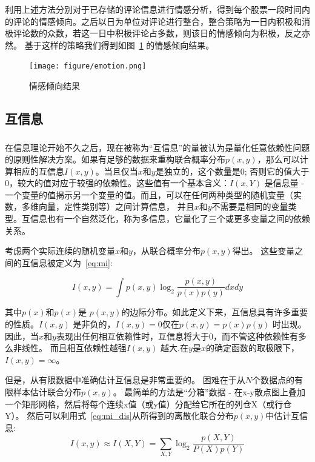 \documentclass[cs4size,a4paper]{ctexart}
\numberwithin{equation}{section}
\numberwithin{table}{section}
\numberwithin{figure}{section}
\newcommand{\upcite}[1]{\textsuperscript{\textsuperscript{\cite{#1}}}}%
\begin{document}
利用上述方法分别对于已存储的评论信息进行情感分析，得到每个股票一段时间内的评论的情感倾向。之后以日为单位对评论进行整合，整合策略为一日内积极和消极评论数的众数，若这一日中积极评论占多数，则该日的情感倾向为积极，反之亦然。
基于这样的策略我们得到如图~\ref{fig:emotion} 的情感倾向结果。
\begin{figure}
  \centering
  \captionsetup{justification=centering,margin=2cm}
  \texttt{[image: figure/emotion.png]}
\caption{情感倾向结果}
\label{fig:emotion}
\end{figure}

\subsection{互信息}

在信息理论开始不久之后\upcite{hockett1953mathematical}，现在被称为“互信息”的量被认为是量化任意依赖性问题的原则性解决方案。如果有足够的数据来重构联合概率分布$p(x,y)$，那么可以计算相应的互信息$I(x,y)$。当且仅当$x$和$y$是独立的，这个数量是0; 否则它的值大于0，较大的值对应于较强的依赖性。这些值有一个基本含义：$I(x,Y)$ 是信息量 - 一个变量的值揭示另一个变量的值。而且，可以在任何两种类型的随机变量（实数，多维向量，定性类别等）之间计算信息，
并且$x$和$y$不需要是相同的变量类型。互信息也有一个自然泛化，称为多信息，它量化了三个或更多变量之间的依赖关系。

考虑两个实际连续的随机变量$x$和$y$，从联合概率分布$p(x,y)$得出。 这些变量之间的互信息被定义为~\ref{eq:mi}:

\begin{equation}\label{eq:mi}
  I(x,y) = \int p(x,y)\log_{2}\frac{p(x,y)}{p(x)p(y)} dx dy
\end{equation}

其中$p(x)$和$p(x)$是 $p(x,y)$的边际分布。如此定义下来，互信息具有许多重要的性质。$I(x,y)$ 是非负的，$I(x,y) = 0$仅在$p(x,y)= p(x)p(y)$ 时出现。 因此，当$x$和$y$表现出任何相互依赖性时，互信息将大于$0$，而不管这种依赖性有多么非线性。 而且相互依赖性越强$I(x,y)$ 越大.在$y$是$x$的确定函数的取极限下，$I(x,y) = \infty$。

但是，从有限数据中准确估计互信息是非常重要的。 困难在于从$N$个数据点的有限样本估计联合分布$p(x,y)$。 最简单的方法是“分箱”数据 - 在x-y散点图上叠加一个矩形网格，然后将每个连续x值（或y值）分配给它所在的列仓X（或行仓Y）。 然后可以利用式~\ref{eq:mi_dis}从所得到的离散化联合分布$p(x,y)$中估计互信息:
\begin{equation}\label{eq:mi_dis}
  I(x,y) \approx I(X,Y) = \sum_{X,Y}\log_{2}\frac{p(X,Y)}{P(X)p(Y)}
\end{equation}
\end{document}
